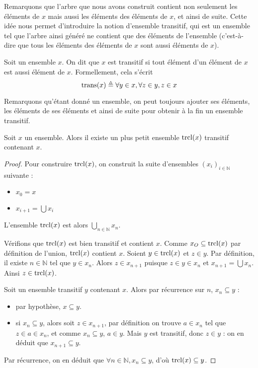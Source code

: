 Remarquons que l'arbre que nous avons construit contient non seulement les
éléments de $x$ mais aussi les éléments des éléments de $x$, et ainsi de suite.
Cette idée nous permet d'introduire la notion d'ensemble transitif, qui est un
ensemble tel que l'arbre ainsi généré ne contient que des éléments de l'ensemble
(c'est-à-dire que tous les éléments des éléments de $x$ sont aussi éléments de
$x$).

\begin{definition}
  Soit un ensemble $x$. On dit que $x$ est transitif si tout élément d'un
  élément de $x$ est aussi élément de $x$. Formellement, cela s'écrit
  \[\operatorname{trans}(x) \triangleq \forall y\in x, \forall z \in y, z\in x\]
\end{definition}

Remarquons qu'étant donné un ensemble, on peut toujours ajouter ses éléments,
les éléments de ses éléments et ainsi de suite pour obtenir à la fin un ensemble
transitif.

\begin{proposition}
  Soit $x$ un ensemble. Alors il existe un plus petit ensemble $\operatorname{trcl}(x)$
  transitif contenant $x$.
\end{proposition}

\begin{proof}
  Pour construire $\operatorname{trcl}(x)$, on construit la suite d'ensembles
  $(x_i)_{i\in\mathbb N}$ suivante :
  \begin{itemize}
  \item $x_0 = x$
  \item $x_{i+1} = \bigcup x_i$
  \end{itemize}
  L'ensemble $\operatorname{trcl}(x)$ est alors $\displaystyle\bigcup_{n\in \mathbb N} x_n$.

  Vérifions que $\operatorname{trcl}(x)$ est bien transitif et contient $x$. Comme
  $x_O\subseteq \operatorname{trcl}(x)$ par définition de l'union, $\operatorname{trcl}(x)$ contient $x$.
  Soient $y\in \operatorname{trcl}(x)$ et $z\in y$. Par définition, il existe $n\in \mathbb N$
  tel que $y\in x_n$. Alors $z\in x_{n+1}$ puisque $z\in y \in x_n$ et
  $x_{n+1}=\bigcup x_n$. Ainsi $z\in \operatorname{trcl}(x)$.

  Soit un ensemble transitif $y$ contenant $x$. Alors par récurrence sur $n$,
  $x_n\subseteq y$ :
  \begin{itemize}
  \item par hypothèse, $x\subseteq y$.
  \item si $x_n\subseteq y$, alors soit $z\in x_{n+1}$, par définition on trouve
    $a\in x_n$ tel que $z\in a \in x_n$, et comme $x_n\subseteq y$, $a\in y$.
    Mais $y$ est transitif, donc $z\in y$ : on en déduit que
    $x_{n+1}\subseteq y$.
  \end{itemize}
  Par récurrence, on en déduit que $\forall n\in\mathbb N, x_n\subseteq y$,
  d'où $\operatorname{trcl}(x)\subseteq y$.
\end{proof}

